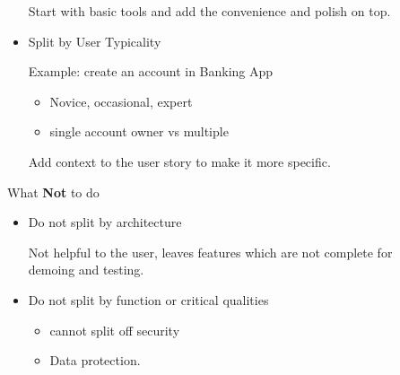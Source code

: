 \documentclass{report}
\begin{document}
\begin{description}
\begin{itemize}
\begin{mdframed}
                \end{mdframed}
                Start with basic tools and add the convenience
                and polish on top.
            \item Split by User Typicality
                \begin{mdframed}
                    Example: create an account in Banking App
                    \begin{itemize}
                        \item Novice, occasional, expert
                        \item single account owner vs multiple
                    \end{itemize}
                \end{mdframed}

                Add context to the user story to make
                it more specific.
                
        \end{itemize}

        What \textbf{Not} to do
        \begin{itemize}
            \item Do not split by architecture
                
                Not helpful to the user, leaves features
                which are not complete for demoing and testing.
            \item Do not split by function or critical
                qualities
                \begin{itemize}
                    \item cannot split off security
                    \item Data protection.
                \end{itemize}


\end{itemize}
\end{description}
\end{document}
